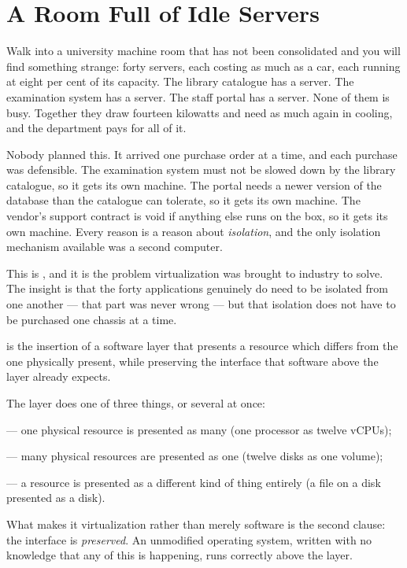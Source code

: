 \section{A Room Full of Idle Servers}

Walk into a university machine room that has not been consolidated and you will
find something strange: forty servers, each costing as much as a car, each
running at eight per cent of its capacity. The library catalogue has a server.
The examination system has a server. The staff portal has a server. None of them
is busy. Together they draw fourteen kilowatts and need as much again in cooling,
and the department pays for all of it.

Nobody planned this. It arrived one purchase order at a time, and each purchase
was defensible. The examination system must not be slowed down by the library
catalogue, so it gets its own machine. The portal needs a newer version of the
database than the catalogue can tolerate, so it gets its own machine. The
vendor's support contract is void if anything else runs on the box, so it gets
its own machine. Every reason is a reason about \emph{isolation}, and the only
isolation mechanism available was a second computer.

This is , and it is the problem virtualization was brought
to industry to solve. The insight is that the forty applications genuinely do
need to be isolated from one another --- that part was never wrong --- but that
isolation does not have to be purchased one chassis at a time.

\begin{definitionbox}[Virtualization]
 is the insertion of a software layer that presents a
resource which differs from the one physically present, while preserving the
interface that software above the layer already expects.

\smallskip
The layer does one of three things, or several at once:
\begin{tight}
  \item {} --- one physical resource is presented as many
        (one processor as twelve vCPUs);
  \item {} --- many physical resources are presented as one
        (twelve disks as one volume);
  \item {} --- a resource is presented as a different kind of
        thing entirely (a file on a disk presented as a disk).
\end{tight}

\smallskip
What makes it virtualization rather than merely software is the second clause:
the interface is \emph{preserved}. An unmodified operating system, written with
no knowledge that any of this is happening, runs correctly above the layer.
\end{definitionbox}

